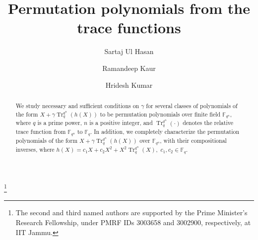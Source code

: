 \documentclass[11pt]{amsart}
\theoremstyle{plain}
\numberwithin{equation}{section}
\theoremstyle{definition}
\begin{document}
\title[Permutation polynomials from the trace functions]{Permutation polynomials from the trace functions}
\author[S. U. Hasan]{Sartaj Ul Hasan}
 \address{Department of Mathematics, Indian Institute of Technology Jammu, Jammu 181221, India}
  
  \author[R. Kaur]{Ramandeep Kaur}
  \address{Department of Mathematics, Indian Institute of Technology Jammu, Jammu 181221, India}
  \author[H. Kumar]{Hridesh Kumar}
\address{Department of Mathematics, Indian Institute of Technology Jammu, Jammu 181221, India}

\thanks{ The second and third named authors are supported by the Prime Minister’s Research Fellowship, under PMRF IDs 3003658 and 3002900, respectively, at IIT Jammu.}
\begin{abstract}


We study necessary and sufficient conditions on $\gamma$ for several classes of polynomials of the form $X+\gamma \operatorname{Tr}_{q}^{q^n}(h(X))$ to be permutation polynomials over finite field $\mathbb{F}_{q^n}$, where $q$ is a prime power, $n$ is a positive integer, and $\operatorname{Tr}_{q}^{q^n}(\cdot)$ denotes the relative trace function from $\mathbb{F}_{q^n}$ to $\mathbb{F}_q$. In addition, we completely characterize the permutation polynomials of the form 
\(
X+\gamma\operatorname{Tr}_{q}^{q^n}(h(X))
\)
over $\mathbb{F}_{q^n}$, with their compositional inverses, where
\(
h(X)=c_1X+c_2X^2+X^2\operatorname{Tr}_{q}^{q^n}(X),
\)
$c_1,c_2\in\mathbb{F}_q.$

\end{abstract}
\maketitle
\end{document}
